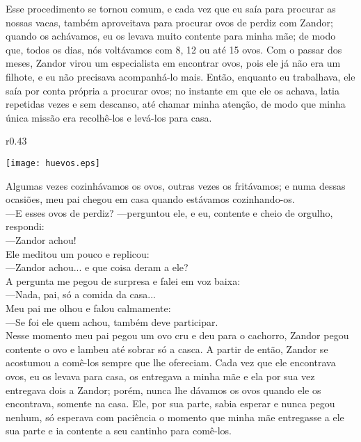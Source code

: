 Esse procedimento se tornou comum, e cada vez que eu saía para procurar as nossas vacas, também aproveitava para procurar ovos de perdiz com Zandor; quando os achávamos, eu os levava muito contente para minha mãe; de modo que, todos os dias, nós voltávamos com 8, 12 ou até 15 ovos. 
Com o passar dos meses, Zandor virou um especialista em encontrar ovos, pois ele já não era um filhote, e eu não precisava acompanhá-lo mais. 
Então, enquanto eu trabalhava, ele saía por conta própria a procurar ovos; no instante em que ele os achava, latia repetidas vezes e sem descanso, até chamar minha atenção, de modo que minha única missão era recolhê-los e levá-los para casa.
\ifdefined\EnableIncludeImages
\begin{wrapfigure}{r}{0.43\textwidth}
  \begin{center}
  \vspace{-20pt}
    \texttt{[image: huevos.eps]}
  \end{center}
  \vspace{-20pt}
\end{wrapfigure}
\fi
Algumas vezes cozinhávamos os ovos, outras vezes os fritávamos; e numa dessas ocasiões, meu pai chegou em casa quando estávamos cozinhando-os.\\\indent
---E esses ovos de perdiz? ---perguntou ele, 
e eu, contente e cheio de orgulho, respondi:\\\indent 
---Zandor achou!\\\indent
Ele meditou um pouco e replicou:\\\indent 
---Zandor achou... e que coisa deram a ele?\\\indent
A pergunta me pegou de surpresa e falei em voz baixa:\\\indent 
---Nada, pai, só a comida da casa... \\\indent
Meu pai me olhou e falou calmamente: \\\indent
---Se foi ele quem achou, também deve participar.\\\indent
Nesse momento meu pai pegou um ovo cru e deu para o cachorro, Zandor pegou contente o ovo e lambeu até sobrar só a casca. 
A partir de então, Zandor se acostumou a comê-los sempre que lhe ofereciam. 
Cada vez que ele encontrava ovos, eu os levava para casa, os entregava a minha mãe e ela por sua vez entregava dois a Zandor; porém, nunca lhe dávamos os ovos quando ele os encontrava, somente na casa. 
Ele, por sua parte, sabia esperar e nunca pegou nenhum, só esperava com paciência o momento que minha mãe entregasse a ele sua parte e ia contente a seu cantinho para comê-los.


